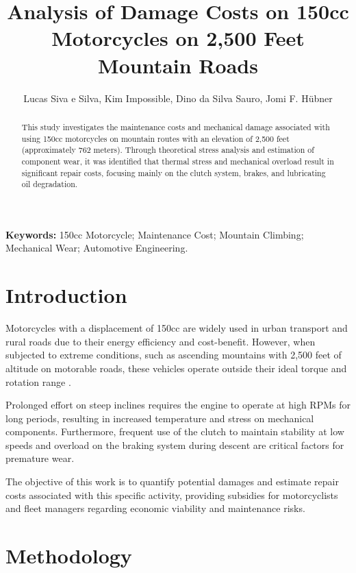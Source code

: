 \documentclass[12pt]{article}
\title{Analysis of Damage Costs on 150cc Motorcycles on 2,500 Feet Mountain Roads}
\author{Lucas Siva e Silva\inst{1}, Kim Impossible\inst{2}, Dino da Silva Sauro\inst{1}, Jomi F. Hübner\inst{3} }
\begin{document}
 

\maketitle

\begin{abstract}
This study investigates the maintenance costs and mechanical damage associated with using 150cc motorcycles on mountain routes with an elevation of 2,500 feet (approximately 762 meters). Through theoretical stress analysis and estimation of component wear, it was identified that thermal stress and mechanical overload result in significant repair costs, focusing mainly on the clutch system, brakes, and lubricating oil degradation.
\end{abstract}
\hrulefill

\begin{flushleft}
\textbf{Keywords:} 150cc Motorcycle; Maintenance Cost; Mountain Climbing; Mechanical Wear; Automotive Engineering.
\end{flushleft}

\section{Introduction}

Motorcycles with a displacement of 150cc are widely used in urban transport and rural roads due to their energy efficiency and cost-benefit. However, when subjected to extreme conditions, such as ascending mountains with 2,500 feet of altitude on motorable roads, these vehicles operate outside their ideal torque and rotation range \cite{cossalter2006}.

Prolonged effort on steep inclines requires the engine to operate at high RPMs for long periods, resulting in increased temperature and stress on mechanical components. Furthermore, frequent use of the clutch to maintain stability at low speeds and overload on the braking system during descent are critical factors for premature wear.

The objective of this work is to quantify potential damages and estimate repair costs associated with this specific activity, providing subsidies for motorcyclists and fleet managers regarding economic viability and maintenance risks.

\section{Methodology} \label{sec:met}
\end{document}
